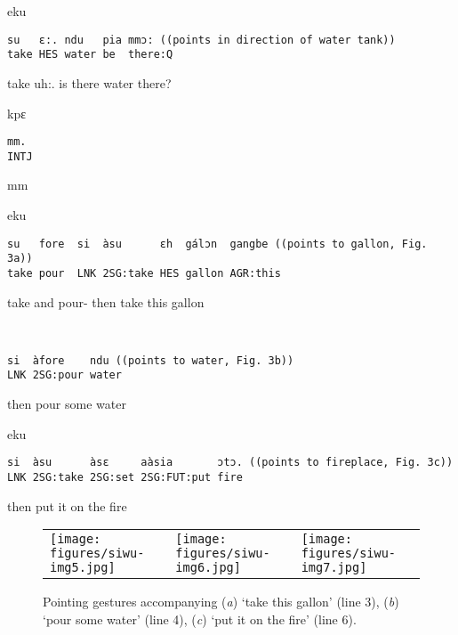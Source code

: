 \documentclass[output=paper]{langsci/langscibook}
\begin{document}
\newpage
{}\vspace{2mm}
%
\begin{transbox}{1}{eku}
\begin{verbatim}
su   ɛ:. ndu   pia mmɔ: ((points in direction of water tank))
take HES water be  there:Q
\end{verbatim}
take uh:. is there water there?
\end{transbox}
%
\begin{transbox}{2}{kpɛ}
\begin{verbatim}
mm.
INTJ
\end{verbatim}
mm
\end{transbox}
% 
\begin{mdframednoverticalspace}[style=firstfoc]
\begin{transbox}{3}{eku}
\begin{verbatim}
su   fore  si  àsu      ɛh  gálɔn  gangbe ((points to gallon, Fig. 3a))
take pour  LNK 2SG:take HES gallon AGR:this
\end{verbatim}
take and pour- then take this gallon
\end{transbox}
\end{mdframednoverticalspace}
%
\begin{mdframednoverticalspace}[style=firstfoc]
\begin{transbox}{4}{~}
\begin{verbatim}
si  àfore    ndu ((points to water, Fig. 3b))
LNK 2SG:pour water
\end{verbatim}
then pour some water
\end{transbox}
\end{mdframednoverticalspace}
%
\vspace{-3mm}
%
\begin{mdframednoverticalspace}[style=firstfoc]
\begin{transbox}{6}{eku}
\begin{verbatim}
si  àsu      àsɛ     aàsia       ɔtɔ. ((points to fireplace, Fig. 3c))
LNK 2SG:take 2SG:set 2SG:FUT:put fire
\end{verbatim}
then put it on the fire
\end{transbox}
\end{mdframednoverticalspace}

\begin{figure}
\begin{tabularx}{\textwidth}{lll}
\centering
\texttt{[image: figures/siwu-img5.jpg]} & \texttt{[image: figures/siwu-img6.jpg]} & \texttt{[image: figures/siwu-img7.jpg]}
\end{tabularx}
\caption{Pointing gestures accompanying (\textit{a}) ‘take this gallon’ (line 3), (\textit{b}) ‘pour some water’ (line 4), (\textit{c}) ‘put it on the fire’ (line 6).}
\label{fig:dingemanse:3}
\end{figure}
\end{document}
